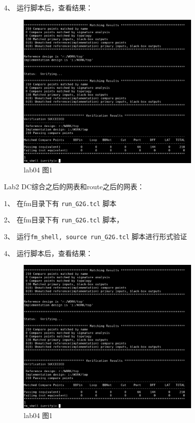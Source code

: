 4、	运行脚本后，查看结果：

\begin{figure}[H]
    \centering
    \includegraphics[width=0.8\textwidth]{images/lab04-01.png}
    \caption{lab04 图1}
\end{figure}

Lab2 DC综合之后的网表和route之后的网表：

1、	在fm目录下有 \texttt{run\_G2G.tcl} 脚本

2、	在fm目录下有 \texttt{run\_G2G.tcl} 脚本，

3、	运行\texttt{fm\_shell, source run\_G2G.tcl} 脚本进行形式验证

4、	运行脚本后，查看结果：

\begin{figure}[H]
    \centering
    \includegraphics[width=0.8\textwidth]{images/lab04-01.png}
    \caption{lab04 图1}
\end{figure}

